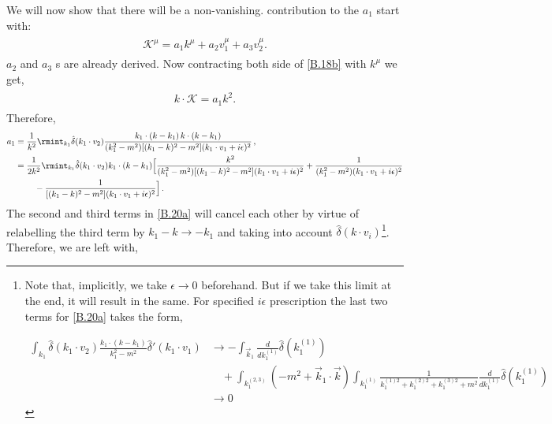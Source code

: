  We will now show that there will be a non-vanishing. contribution to the $a_1$ %
 start with:
\begin{align}
    \begin{split}
        \mathcal{K}^\mu= a_1k^\mu+a_2 v_1^\mu+a_3 v_2^\mu.\label{B.18b}
    \end{split}
\end{align}
$a_2$ and $a_3$ s are already derived. Now contracting both side of \eqref{B.18b} with $k^\mu$ we get,
\begin{align}
    \begin{split}
        k\cdot \mathcal{K}= a_1 k^2.
    \end{split}
\end{align}
Therefore,
\begin{align}
    \begin{split}
        a_1&=\frac{1}{k^2}\rmint_{k_1}\hat\delta(k_1\cdot v_2)\frac{k_1\cdot (k-k_1)\,k\cdot (k-k_1)}{(k_1^2-m^2)[(k_1-k)^2-m^2](k_1\cdot v_1+i\epsilon)^2}\,,\\ &
        =\frac{1}{2k^2}\rmint_{k_1}\hat\delta(k_1\cdot v_2)k_1\cdot (k-k_1)\Big[\frac{k^2}{(k_1^2-m^2)[(k_1-k)^2-m^2](k_1\cdot v_1+i\epsilon)^2}+\frac{1}{(k_1^2-m^2)(k_1\cdot v_1+i\epsilon)^2}\\ &
        \hspace{0.8cm}-\frac{1}{[(k_1-k)^2-m^2](k_1\cdot v_1+i\epsilon)^2}\Big]\,.\label{B.20a}
    \end{split}
\end{align}
The second and third terms in \eqref{B.20a} will cancel each other by virtue of relabelling the third term by $k_1-k\to -k_1$ and taking into account $\hat\delta(k\cdot v_i)$\footnote{Note that, implicitly, we take $\epsilon\to 0$ beforehand. But if we take this limit at the end, it will result in the same. For  specified $i\epsilon$ prescription the last two terms for \eqref{B.20a} takes the form,

{\footnotesize
\[
\begin{aligned}
\int_{k_1}\hat\delta(k_1\cdot v_2)\frac{k_1\cdot (k-k_1)}{k_1^2-m^2}\hat\delta'(k_1\cdot v_1)
&\to -\int_{\vec k_1}\frac{d}{dk_1^{(1)}}\hat\delta(k_1^{(1)})\\
&\quad +\int_{ k_1^{(2,3)}}(-m^2+\vec k_1\cdot \vec k)\int_{k_1^{(1)}}\frac{1}{k_1^{(1)2}+k_1^{(2)2}+k_1^{(3)2}+m^2}\frac{d}{dk_1^{(1)}}\hat\delta(k_1^{(1)})\\
&\to 0
\end{aligned}
\]
}}. Therefore, we are left with,
